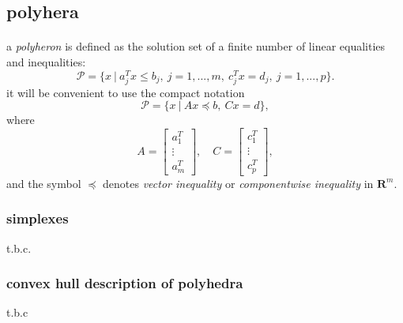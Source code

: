 \documentclass{article}
\begin{document}
  \subsection{polyhera}
    \paragraph{} a \textit{polyheron} is defined as the solution set of a finite number of linear equalities and inequalities:
    \begin{equation}
      \mathcal{P} = \{x\ |\ a_j^Tx \leq b_j,\ j = 1,...,m,\ c_j^Tx = d_j,\ j = 1,...,p\}.
    \end{equation}
    it will be convenient to use the compact notation
    \begin{equation}
      \mathcal{P} = \{x\ |\ Ax\preceq b,\ Cx = d\},
    \end{equation}
    where
    \begin{equation}
      A =
      \begin{bmatrix}
        a_1^T \\
        \vdots \\
        a_m^T
      \end{bmatrix}
      ,\quad
      C =
      \begin{bmatrix}
        c_1^T \\
        \vdots \\
        c_p^T
      \end{bmatrix}
      ,
    \end{equation}
    and the symbol $\preceq$ denotes \textit{vector inequality} or \textit{componentwise inequality} in $\mathbf{R}^m$.
    \subsubsection{simplexes}
      t.b.c.
    \subsubsection{convex hull description of polyhedra}
      t.b.c
\end{document}
